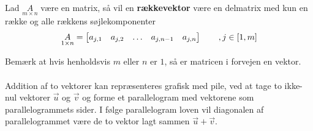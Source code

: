 \begin{defn}[Rækkevektor]
Lad $\underset{m \times n}{A}$ være en matrix, så vil en \textbf{rækkevektor} være en delmatrix med kun en række og alle rækkens søjlekomponenter
\begin{align*}
\underset{1 \times n}{A} = 
\rvect{a_{j,1} & a_{j,2} & \dots & a_{j,n-1} & a_{j,n}}
\qquad , j\in [1,m]%
\end{align*}
\end{defn}
Bemærk at hvis henholdsvis $m$ eller $n$ er $1$, så er matricen i forvejen en vektor.\\
\\
Addition af to vektorer kan repræsenteres grafisk med pile, ved at tage to ikke-nul vektorer $\vec{u}$ og $\vec{v}$ og forme et parallelogram med vektorene som parallelogrammets sider. I følge parallelogram loven vil diagonalen af parallelogrammet være de to vektor lagt sammen $\vec{u}+\vec{v}$.
